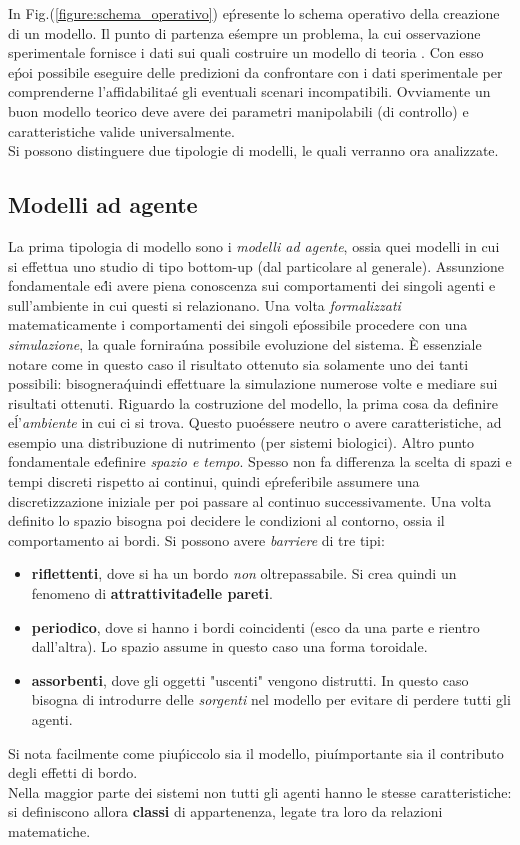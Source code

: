 \documentclass[12pt, a4paper]{book}
\theoremstyle{theorem}
\begin{document}
			In Fig.(\ref{figure:schema_operativo}) e\' presente lo schema operativo della creazione di un modello.
			Il punto di partenza e\' sempre un problema, la cui osservazione sperimentale fornisce i dati sui quali costruire un modello di teoria .
			Con esso e\' poi possibile eseguire delle predizioni da confrontare con i dati sperimentale per comprenderne l'affidabilita\' e gli eventuali scenari incompatibili.
			Ovviamente un buon modello teorico deve avere dei parametri manipolabili (di controllo) e caratteristiche valide universalmente.
			\\
			Si possono distinguere due tipologie di modelli, le quali verranno ora analizzate.
			\subsection{Modelli ad agente}
				La prima tipologia di modello sono i \emph{modelli ad agente}, ossia quei modelli in cui si effettua uno studio di tipo bottom-up (dal particolare al generale).
				Assunzione fondamentale e\' di avere piena conoscenza sui comportamenti dei singoli agenti e sull'ambiente in cui questi si relazionano.
				Una volta \emph{formalizzati} matematicamente i comportamenti dei singoli e\' possibile procedere con una \emph{simulazione}, la quale fornira\' una possibile evoluzione del sistema.
				È essenziale notare come in questo caso il risultato ottenuto sia solamente uno dei tanti possibili: bisognera\' quindi effettuare la simulazione numerose volte e mediare sui risultati ottenuti.
				Riguardo la costruzione del modello, la prima cosa da definire e\' l'\textit{ambiente} in cui ci si trova. 
				Questo puo\' essere neutro o avere caratteristiche, ad esempio una distribuzione di nutrimento (per sistemi biologici).
				Altro punto fondamentale e\' definire \textit{spazio e tempo}. 
				Spesso non fa differenza la scelta di spazi e tempi discreti rispetto ai continui, quindi e\' preferibile assumere una discretizzazione iniziale per poi passare al continuo successivamente.
				Una volta definito lo spazio bisogna poi decidere le condizioni al contorno, ossia il comportamento ai bordi. 
				Si possono avere \textit{barriere} di tre tipi:
				\begin{itemize}
					\item \textbf{riflettenti}, dove si ha un bordo \textit{non} oltrepassabile. Si crea quindi un fenomeno di \textbf{attrattivita\' delle pareti}.
					\item \textbf{periodico}, dove si hanno i bordi coincidenti (esco da una parte e rientro dall'altra). Lo spazio assume in questo caso una forma toroidale.
					\item \textbf{assorbenti}, dove gli oggetti "uscenti" vengono distrutti. In questo caso bisogna di introdurre delle \textit{sorgenti} nel modello per evitare di perdere tutti gli agenti.
				\end{itemize}
				Si nota facilmente come piu\' piccolo sia il modello, piu\' importante sia il contributo degli effetti di bordo.\\
				Nella maggior parte dei sistemi non tutti gli agenti hanno le stesse caratteristiche: si definiscono allora \textbf{classi} di appartenenza, legate tra loro da relazioni matematiche.
\end{document}
